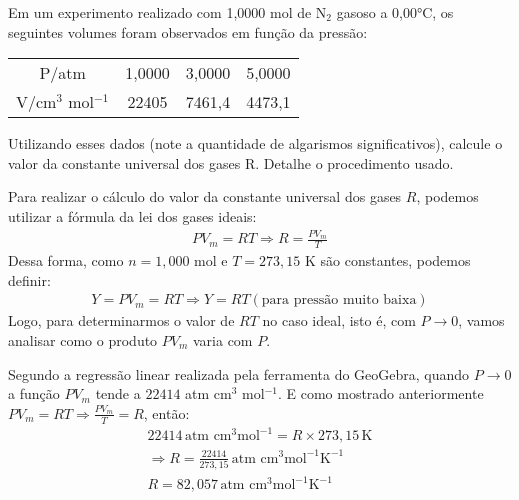 \begin{xcs}
    Em um experimento realizado com 1,0000 mol de N\(_2\) gasoso a 0,00°C, os
    seguintes volumes foram observados em função da pressão: 
    \begin{center}
    \begin{tabular}{c | c c c}
    \hline
        P/atm & 1,0000 & 3,0000 & 5,0000\\
        V/cm\(^3\) mol\(^{-1}\) & 22405 & 7461,4 & 4473,1\\
    \hline
    \end{tabular}
    \end{center}
    Utilizando esses dados (note a quantidade de algarismos significativos),
    calcule o valor da constante universal dos gases R. Detalhe o procedimento
    usado.
\end{xcs}
\begin{rsl}
    
    Para realizar o cálculo do valor da constante universal dos gases \( R \),
    podemos utilizar a fórmula da lei dos gases ideais: 
    \begin{align*}
        PV_m = RT \Rightarrow R = \frac{PV_m}{T}
    \end{align*}
    Dessa forma, como \( n = 1,000 \) mol e \( T = 273,15 \) K são constantes,
    podemos definir:
    \begin{align*}
        Y = PV_m = RT \Rightarrow Y = RT (\text{para pressão
        muito baixa})
    \end{align*}
    Logo, para determinarmos o valor de \( RT \) no caso ideal, 
    isto é, com \( P \to 0 \), vamos analisar como o produto \( PV_m \)
    varia com \( P \).

    Segundo a regressão linear realizada pela ferramenta do GeoGebra, quando \(
    P \to 0 \) a função \( PV_m \) tende a \( 22414 \) atm cm\(^3\)
    mol\(^{-1}\). 
    E como mostrado anteriormente \( PV_m = RT \Rightarrow
    \frac{PV_m}{T} = R \), então:
    \begin{align*}
        22414 \, \text{atm cm}^3 \text{mol}^{-1} = R \times 273,15 \, \text{K}\\
        \Rightarrow R = \frac{22414}{273,15} \, \text{atm cm}^3
        \text{mol}^{-1} \text{K}^{-1}\\
        R = 82,057 \, \text{atm cm}^3 \text{mol}^{-1} \text{K}^{-1}
    \end{align*}
    
\end{rsl}
